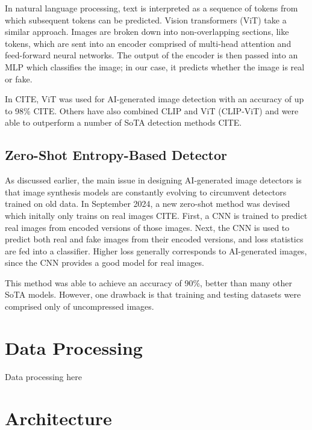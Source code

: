 \documentclass{article} %
\begin{document}
In natural language processing, text is interpreted as a sequence of tokens from which subsequent tokens can be predicted. Vision transformers (ViT) take a similar approach. Images are broken down into non-overlapping sections, like tokens, which are sent into an encoder comprised of multi-head attention and feed-forward neural networks. The output of the encoder is then passed into an MLP which classifies the image; in our case, it predicts whether the image is real or fake.

In CITE, ViT was used for AI-generated image detection with an accuracy of up to 98\% CITE. Others have also combined CLIP and ViT (CLIP-ViT) and were able to outperform a number of SoTA detection methods CITE.

\subsection{Zero-Shot Entropy-Based Detector}

As discussed earlier, the main issue in designing AI-generated image detectors is that image synthesis models are constantly evolving to circumvent detectors trained on old data. In September 2024, a new zero-shot method was devised which initally only trains on real images CITE. First, a CNN is trained to predict real images from encoded versions of those images. Next, the CNN is used to predict both real and fake images from their encoded versions, and loss statistics are fed into a classifier. Higher loss generally corresponds to AI-generated images, since the CNN provides a good model for real images.

This method was able to achieve an accuracy of 90\%, better than many other SoTA models. However, one drawback is that training and testing datasets were comprised only of uncompressed images.


\section{Data Processing}
\label{data}

Data processing here

\section{Architecture}
\label{arch}
\end{document}
